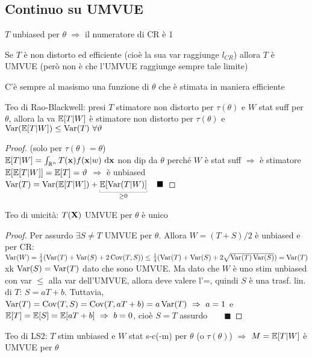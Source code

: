 \subsection{Continuo su UMVUE}

$T$ unbiased per $\theta$ $\Rightarrow$ il numeratore di CR è 1

\smallskip

Se $T$ è non distorto ed efficiente (cioè la sua var raggiunge $l_{CR}$) allora $T$ è UMVUE (però non è che l'UMVUE raggiunge sempre tale limite)

\smallskip

C'è sempre al masismo una funzione di $\theta$ che è stimata in maniera efficiente

\smallskip

Teo di Rao-Blackwell: presi $T$ stimatore non distorto per $\tau(\theta)$ e $W$ stat suff per $\theta$, allora la va $\mathbb{E}[T|W]$ è stimatore non distorto per $\tau(\theta)$ e $\operatorname{Var}(\mathbb{E}[T|W])\leq\operatorname{Var}(T)\ \forall \vartheta$

\begin{proof}
(solo per $\tau(\theta)=\theta$) \\
$\mathbb{E}[T|W]=\int_{\mathbb{R}^n} T(\mathbf{x})f(\mathbf{x}|w)\  \mathrm{d} \mathbf{x}$ non dip da $\theta$ perché $W$ è stat suff $\Rightarrow$ è stimatore \\
$\mathbb{E}[\mathbb{E}[T|W]]=\mathbb{E}[T]=\vartheta$ $\Rightarrow$ è unbiased \\
$\Var(T)=\Var(\EE[T|W])+\underbracket[0.2pt]{\EE[\Var(T|W)]}_{\geq0}\quad \blacksquare$
\end{proof}

Teo di unicità: $T(\mathbf{X})$ UMVUE per $\theta$ è unico

\begin{proof}
Per assurdo $\exists S\neq T$ UMVUE per $\theta$. Allora $W=(T+S)/2$ è unbiased e per CR: \\
$\operatorname{Var}(W)=\frac{1}{4}(\operatorname{Var}(T)+\operatorname{Var}(S)+2\operatorname{Cov}(T,S))\leq
\frac{1}{4}(\operatorname{Var}(T)+\operatorname{Var}(S)+2\sqrt{\operatorname{Var}(T)\operatorname{Var}(S)})=\operatorname{Var}(T)$ xk $\operatorname{Var}(S)=\operatorname{Var}(T)$ dato che sono UMVUE.
Ma dato che $W$ è uno stim unbiased con var $\leq$ alla var dell'UMVUE, allora deve valere l'=, quindi $S$ è una trasf. lin. di $T$: $S=aT+b$. Tuttavia, $\Var(T)=\Cov(T,S)=\Cov(T,aT+b)=a\Var(T)\ \Rightarrow\ a=1$ e $\mathbb{E}[T]=\mathbb{E}[S]=\mathbb{E}[aT+b]\ \Rightarrow\ b=0$, cioè $S=T$ assurdo$\qquad \blacksquare$
\end{proof}

Teo di LS2: $T$ stim unbiased e $W$ stat s-c(-m) per $\theta$ (o $\tau(\theta)$) $\Rightarrow$ $M=\mathbb{E}[T|W]$ è UMVUE per $\theta$

